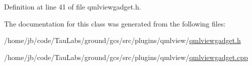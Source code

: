 \-Definition at line 41 of file qmlviewgadget.\-h.



\-The documentation for this class was generated from the following files\-:\begin{DoxyCompactItemize}
\item 
/home/jb/code/\-Tau\-Labs/ground/gcs/src/plugins/qmlview/\hyperlink{qmlviewgadget_8h}{qmlviewgadget.\-h}\item 
/home/jb/code/\-Tau\-Labs/ground/gcs/src/plugins/qmlview/\hyperlink{qmlviewgadget_8cpp}{qmlviewgadget.\-cpp}\end{DoxyCompactItemize}
